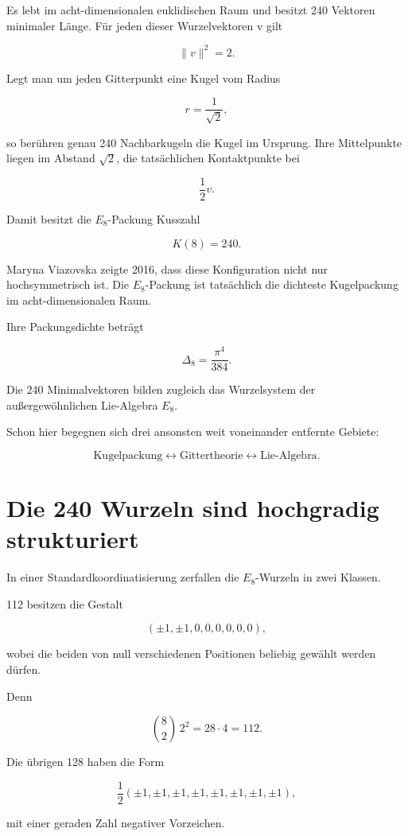 \documentclass[11pt,a4paper]{article}
\begin{document}
Es lebt im acht-dimensionalen euklidischen Raum und besitzt 240 Vektoren minimaler Länge. Für jeden dieser Wurzelvektoren v gilt


\[
\|v\|^2=2.
\]


Legt man um jeden Gitterpunkt eine Kugel vom Radius


\[
r=\frac{1}{\sqrt{2}},
\]


so berühren genau 240 Nachbarkugeln die Kugel im Ursprung. Ihre Mittelpunkte liegen im Abstand \(\sqrt{2}\), die tatsächlichen Kontaktpunkte bei


\[
\frac12v.
\]


Damit besitzt die \(E_8\)-Packung Kusszahl


\[
K(8)=240.
\]


Maryna Viazovska zeigte 2016, dass diese Konfiguration nicht nur hochsymmetrisch ist. Die \(E_8\)-Packung ist tatsächlich die dichteste Kugelpackung im acht-dimensionalen Raum.


Ihre Packungsdichte beträgt


\[
\Delta_8=\frac{\pi^4}{384}.
\]


Die 240 Minimalvektoren bilden zugleich das Wurzelsystem der außergewöhnlichen Lie-Algebra \(E_8\).


Schon hier begegnen sich drei ansonsten weit voneinander entfernte Gebiete:


\[
\text{Kugelpackung}
\longleftrightarrow
\text{Gittertheorie}
\longleftrightarrow
\text{Lie-Algebra}.
\]





\section{Die 240 Wurzeln sind hochgradig strukturiert}


In einer Standardkoordinatisierung zerfallen die \(E_8\)-Wurzeln in zwei Klassen.


112 besitzen die Gestalt


\[
(\pm1,\pm1,0,0,0,0,0,0),
\]


wobei die beiden von null verschiedenen Positionen beliebig gewählt werden dürfen.


Denn


\[
\binom82\,2^2=28\cdot4=112.
\]


Die übrigen 128 haben die Form


\[
\frac12(\pm1,\pm1,\pm1,\pm1,\pm1,\pm1,\pm1,\pm1),
\]


mit einer geraden Zahl negativer Vorzeichen.
\end{document}
